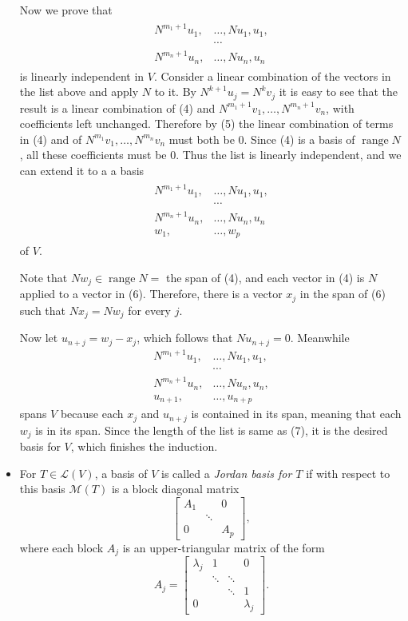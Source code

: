 \documentclass[11pt]{article}
\newcommand{\df}[1]{\textit{\textsf{#1}}}
\renewcommand{\r}{\operatorname{range}}
\newcommand{\LV}{\mathcal{L}(V)}
\newcommand{\M}{\mathcal{M}}
\begin{document}
\begin{itemize}
    Now we prove that \begin{align}
    \begin{split}
        N^{m_1+1}u_1,&\dots,Nu_1,u_1, \\ &\cdots \\ N^{m_n+1}u_n,&\dots,Nu_n,u_n
    \end{split} \end{align} is linearly independent in $V$. Consider a linear combination of the vectors in the list above and apply $N$ to it. By $N^{k+1}u_j = N^k v_j$ it is easy to see that the result is a linear combination of (4) and $N^{m_1+1}v_1,\dots,N^{m_n+1}v_n$, with coefficients left unchanged. Therefore by (5) the linear combination of terms in (4) and of $N^{m_1}v_1,\dots,N^{m_n}v_n$ must both be 0. Since (4) is a basis of $\r N$, all these coefficients must be 0. Thus the list is linearly independent, and we can extend it to a a basis \begin{align}
    \begin{split}
        N^{m_1+1}u_1,&\dots,Nu_1,u_1, \\ &\cdots \\ N^{m_n+1}u_n,&\dots,Nu_n,u_n \\ w_1,&\dots,w_p
    \end{split}
    \end{align} of $V$.

    Note that $Nw_j \in \r N =$ the span of (4), and each vector in (4) is $N$ applied to a vector in (6). Therefore, there is a vector $x_j$ in the span of (6) such that $Nx_j = Nw_j$ for every $j$.

    Now let $u_{n+j} = w_j - x_j$, which follows that $Nu_{n+j} = 0$. Meanwhile \begin{align*}
        N^{m_1+1}u_1,&\dots,Nu_1,u_1, \\ &\cdots \\ N^{m_n+1}u_n,&\dots,Nu_n,u_n, \\ u_{n+1},&\dots,u_{n+p}
    \end{align*}
    spans $V$ because each $x_j$ and $u_{n+j}$ is contained in its span, meaning that each $w_j$ is in its span. Since the length of the list is same as (7), it is the desired basis for $V$, which finishes the induction.
    \item For $T \in \LV$, a basis of $V$ is called a \df{Jordan basis for $T$} if with respect to this basis $\M(T)$ is a block diagonal matrix \[\begin{bmatrix}
        A_1 & & 0 \\ & \ddots & \\ 0 & & A_p
    \end{bmatrix},\] where each block $A_j$ is an upper-triangular matrix of the form \[A_j = \begin{bmatrix}
        \lambda_j & 1 & & 0 \\
        & \ddots & \ddots & \\
        & & \ddots & 1 \\
        0 & & & \lambda_j
    \end{bmatrix}.\]


\end{itemize}
\end{document}
